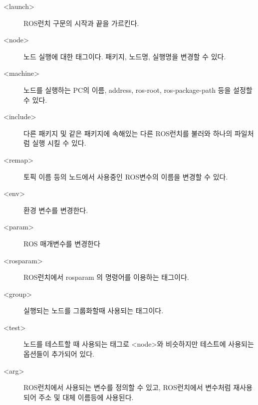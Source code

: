 \vspace{\baselineskip}
\begin{description}
\item[\textless launch\textgreater] ROS런치 구문의 시작과 끝을 가르킨다.
\item[\textless node\textgreater] 노드 실행에 대한 태그이다. 패키지, 노드명, 실행명을 변경할 수 있다.
\item[\textless machine\textgreater] 노드를 실행하는 PC의 이름, address,  ros-root,  ros-package-path 등을 설정할 수 있다.
\item[\textless include\textgreater] 다른 패키지 및 같은 패키지에 속해있는 다른 ROS런치를 불러와 하나의 파일처럼 실행 시킬 수 있다.
\item[\textless remap\textgreater] 토픽 이름 등의 노드에서 사용중인 ROS변수의 이름을 변경할 수 있다. 
\item[\textless env\textgreater] 환경 변수를 변경한다.
\item[\textless param\textgreater] ROS 매개변수를 변경한다
\item[\textless rosparam\textgreater] ROS런치에서 rosparam 의 명령어를 이용하는 태그이다.
\item[\textless group\textgreater] 실행되는 노드를 그룹화할때 사용되는 태그이다.
\item[\textless test\textgreater] 노드를 테스트할 때 사용되는 태그로 \textless node\textgreater 와 비슷하지만 테스트에 사용되는 옵션들이 추가되어 있다.
\item[\textless arg\textgreater] ROS런치에서 사용되는 변수를 정의할 수 있고, ROS런치에서 변수처럼 재사용되어 주소 및 대체 이름등에 사용된다.
\end{description}

